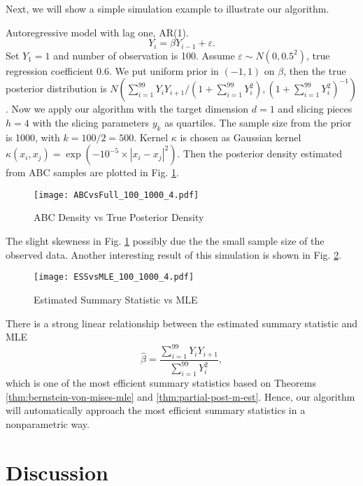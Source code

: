 Next, we will show a simple simulation example to illustrate our algorithm.

\begin{example}
Autoregressive model with lag one, AR(1). 
\[
Y_{i}=\beta Y_{i-1}+\varepsilon.
\]
Set $Y_{1}=1$ and number of observation is 100. Assume $\varepsilon\sim N\left(0,0.5^{2}\right)$,
true regression coefficient 0.6. We put uniform prior in $\left(-1,1\right)$
on $\beta$, then the true posterior distribution is $N\left(\sum_{i=1}^{99}Y_{i}Y_{i+1}/\left(1+\sum_{i=1}^{99}Y_{i}^{2}\right),\left(1+\sum_{i=1}^{99}Y_{i}^{2}\right)^{-1}\right)$.
Now we apply our algorithm with the target dimension $d=1$ and slicing
pieces $h=4$ with the slicing parameters $y_{k}$ as quartiles. The
sample size from the prior is 1000, with $k=100/2=500$. Kernel $\kappa$
is chosen as Gaussian kernel $\kappa\left(x_{i},x_{j}\right)=\exp\left(-10^{-5}\times |x_{i}-x_{j} |^{2}\right)$.
Then the posterior density estimated from ABC samples are plotted
in Fig. \ref{fig:ABC-vs-True}. %
\begin{comment}
try increasing number of slice and k
\end{comment}


\begin{figure}
\texttt{[image: ABCvsFull\_100\_1000\_4.pdf]}\protect\caption{ABC Density vs True Posterior Density\label{fig:ABC-vs-True}}
\end{figure}
The slight skewness in Fig. \ref{fig:ABC-vs-True} possibly due the
the small sample size of the observed data. Another interesting result
of this simulation is shown in Fig. \ref{fig:ss-vs-mle}. 
\begin{figure}
\texttt{[image: ESSvsMLE\_100\_1000\_4.pdf]}\protect\caption{Estimated Summary Statistic vs MLE\label{fig:ss-vs-mle}}
\end{figure}
There is a strong linear relationship between the estimated summary
statistic and MLE 
\[
\hat{\beta}=\frac{\sum_{i=1}^{99}Y_{i}Y_{i+1}}{\sum_{i=1}^{99}Y_{i}^{2}},
\]
which is one of the most efficient summary {{} } {statistics
} based on Theorems \ref{thm:bernstein-von-mises-mle} and \ref{thm:partial-post-m-est}.
Hence, our algorithm will automatically approach the most efficient
summary statistics in a nonparametric way. 
\end{example}

\section{\label{sec:Discussion}Discussion}

